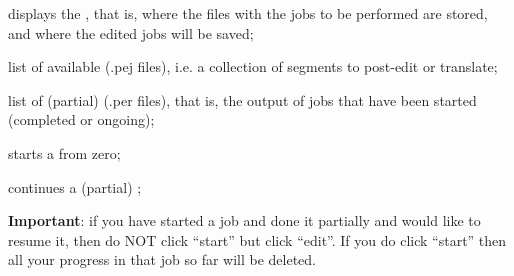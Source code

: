 \begin{description}
	\setlength\itemindent{0.5cm}  
	\item[\tt Workspace] displays the , that is, where the files with the jobs to be performed are stored, and where the edited jobs will be saved;
	\item[\tt Jobs] list of available  (.pej files), i.e. a collection of segments to post-edit or translate;
	\item[\tt Results] list of (partial)  (.per files), that is, the output of jobs that have been started (completed or ongoing);
	\item[\tt Start] starts a  from zero;
	\item[\tt Edit] continues a (partial) ;
\end{description}

\textbf{Important}: if you have started a job and done it partially and would like to resume it, then do NOT click ``start'' but click ``edit''. If you do click ``start'' then all your progress in that job so far will be deleted.



